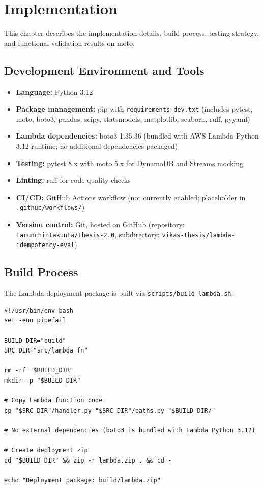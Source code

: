 \chapter{Implementation}

This chapter describes the implementation details, build process, testing strategy, and functional validation results on moto.

\section{Development Environment and Tools}

\begin{itemize}
    \item \textbf{Language:} Python 3.12
    \item \textbf{Package management:} pip with \texttt{requirements-dev.txt} (includes pytest, moto, boto3, pandas, scipy, statsmodels, matplotlib, seaborn, ruff, pyyaml)
    \item \textbf{Lambda dependencies:} boto3 1.35.36 (bundled with AWS Lambda Python 3.12 runtime; no additional dependencies packaged)
    \item \textbf{Testing:} pytest 8.x with moto 5.x for DynamoDB and Streams mocking
    \item \textbf{Linting:} ruff for code quality checks
    \item \textbf{CI/CD:} GitHub Actions workflow (not currently enabled; placeholder in \texttt{.github/workflows/})
    \item \textbf{Version control:} Git, hosted on GitHub (repository: \texttt{Tarunchintakunta/Thesis-2.0}, subdirectory: \texttt{vikas-thesis/lambda-idempotency-eval})
\end{itemize}

\section{Build Process}

The Lambda deployment package is built via \texttt{scripts/build\_lambda.sh}:

\begin{verbatim}
#!/usr/bin/env bash
set -euo pipefail

BUILD_DIR="build"
SRC_DIR="src/lambda_fn"

rm -rf "$BUILD_DIR"
mkdir -p "$BUILD_DIR"

# Copy Lambda function code
cp "$SRC_DIR"/handler.py "$SRC_DIR"/paths.py "$BUILD_DIR/"

# No external dependencies (boto3 is bundled with Lambda Python 3.12)

# Create deployment zip
cd "$BUILD_DIR" && zip -r lambda.zip . && cd -

echo "Deployment package: build/lambda.zip"
\end{verbatim}

